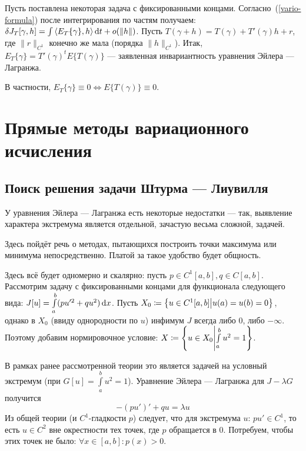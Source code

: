 \documentclass[a4paper]{article}
\begin{document}
    Пусть поставлена некоторая задача с фиксированными концами.
    Согласно~(\cref{vario-formula}) после интегрирования по частям получаем: $\delta J_T[\gamma, h] = \int\left\langle E_T\{\gamma\}, h\right\rangle\operatorname{d}\! t + o(\|h\|)$.
    Пусть $T(\gamma + h) = T(\gamma) + T'(\gamma)h + r$, где $\|r\|_{C^1}$ конечно же мала (порядка $\|h\|_{C^1}$).
    Итак, $E_T\{\gamma\} = T'(\gamma)^t E\{T(\gamma)\}$ --- заявленная инвариантность уравнения Эйлера --- Лагранжа.
    
    В частности, $E_T\{\gamma\} \equiv 0 \Leftrightarrow E\{T(\gamma)\} \equiv 0$.
    \section{Прямые методы вариационного исчисления}
    \subsection{Поиск решения задачи Штурма --- Лиувилля}
    У уравнения Эйлера --- Лагранжа есть некоторые недостатки --- так, выявление характера экстремума является отдельной, зачастую весьма сложной, задачей.

    Здесь пойдёт речь о методах, пытающихся построить точки максимума или минимума непосредственно.
    Платой за такое удобство будет общность.

    Здесь всё будет одномерно и скалярно: пусть $p \in C^1[a, b],  q\in C[a, b]$.
    Рассмотрим задачу с фиксированными концами для функционала следующего вида: $J[u] = \int\limits_{a}^{b}(p u'^2 + qu^2)\operatorname{d}\! x$.
    Пусть $X_0 \coloneqq \left\{u \in C^1[a, b]\middle|u(a) = u(b) = 0\right\}$, однако в $X_0$ (ввиду однородности по $u$) инфимум $J$ всегда либо $0$, либо $-\infty$.
    Поэтому добавим нормировочное условие: $X \coloneqq \left\{u \in X_0\middle|\int\limits_{a}^{b}u^2 = 1\right\}$.

    В рамках ранее рассмотренной теории это является задачей на условный экстремум (при $G[u] = \int\limits_{a}^{b}u^2 = 1$).
    Уравнение Эйлера --- Лагранжа для $J - \lambda G$ получится
    \[-(p u')' + qu = \lambda u\tag{$*$}\label{sturm}\]
    Из общей теории (и $C^1$-гладкости $p$) следует, что для экстремума $u$: $p u' \in C^1$, то есть $u \in C^2$ вне окрестности тех точек, где $p$ обращается в $0$.
    Потребуем, чтобы этих точек не было: $\forall x \in [a, b]: p(x) > 0$.
\end{document}
